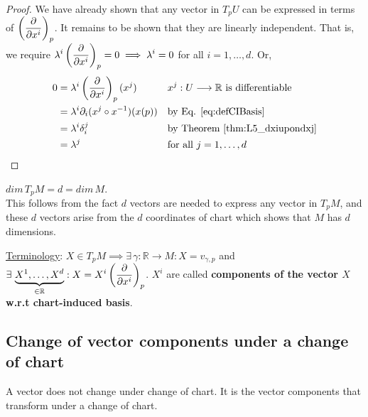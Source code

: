 \begin{proof} We have already shown that any vector in $T_pU$ can be expressed in terms of $\displaystyle\left(\frac{\partial }{\partial x^i}\right)_p$. It remains to be shown that they are linearly independent. That is, we require $\displaystyle\lambda^i \left(\frac{\partial }{\partial x^i}\right)_p = 0 \implies \lambda^i = 0$ for all $i = 1, \dotsc, d$. Or,
\begin{align*}
0 & = \lambda^i \left(\frac{\partial }{\partial x^i}\right)_p(x^j) && x^j : U \longrightarrow \mathbb{R} \text{ is differentiable}\\
& = \lambda^i \partial_i (x^j \circ x^{-1})(x(p)) && \text{by Eq. \ref{eq:defCIBasis}} \\
& = \lambda^i \delta^j_i && \text{by Theorem \ref{thm:L5_dxiupondxj}} \\
& = \lambda^j && \text{for all } j = 1, \dotsc, d 
\end{align*}
\end{proof}

\begin{corollary}
$dim \, T_pM = d = dim \, M$. \\
This follows from the fact $d$ vectors are needed to express any vector in $T_pM$, and these $d$ vectors arise from the $d$ coordinates of chart which shows that $M$ has $d$ dimensions.
\end{corollary}

\underline{Terminology}: $X \in T_pM \implies \exists \, \gamma : \mathbb{R} \to M : X = v_{\gamma,p}$ and $\displaystyle \exists \, \underbrace{X^1, \dotsc, X^d}_{\in \mathbb{R}} : X = X^i \left(\frac{\partial }{\partial x^i}\right)_p$. $X^i$ are called \textbf{components of the vector $X$ w.r.t chart-induced basis}.

\subsection{Change of vector components under a change of chart}
 A vector does not change under change of chart. It is the vector components that transform under a change of chart.

